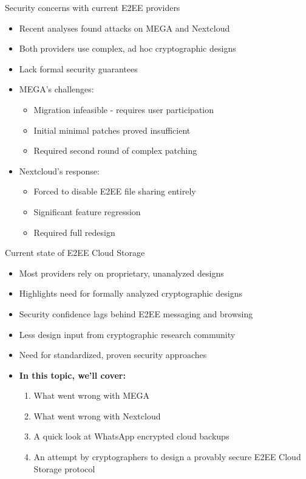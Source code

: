 \documentclass[aspectratio=169, lualatex, handout]{beamer}
\begin{document}
\begin{frame}{Security concerns with current E2EE providers}
	\begin{itemize}
		\item Recent analyses found attacks on MEGA and Nextcloud
		\item Both providers use complex, ad hoc cryptographic designs
		\item Lack formal security guarantees
		\item MEGA's challenges:
		      \begin{itemize}
			      \item Migration infeasible - requires user participation
			      \item Initial minimal patches proved insufficient
			      \item Required second round of complex patching
		      \end{itemize}
		\item Nextcloud's response:
		      \begin{itemize}
			      \item Forced to disable E2EE file sharing entirely
			      \item Significant feature regression
			      \item Required full redesign
		      \end{itemize}
	\end{itemize}
\end{frame}

\begin{frame}{Current state of E2EE Cloud Storage}
	\begin{itemize}
		\item Most providers rely on proprietary, unanalyzed designs
		\item Highlights need for formally analyzed cryptographic designs
		\item Security confidence lags behind E2EE messaging and browsing
		\item Less design input from cryptographic research community
		\item Need for standardized, proven security approaches
		\item \textbf{In this topic, we'll cover:} \begin{enumerate}
			      \item What went wrong with MEGA
			      \item What went wrong with Nextcloud
			      \item A quick look at WhatsApp encrypted cloud backups
			      \item An attempt by cryptographers to design a provably secure E2EE Cloud Storage protocol
		      \end{enumerate}
	\end{itemize}
\end{frame}
\end{document}
